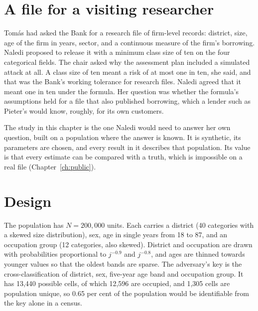 \section{A file for a visiting researcher}

Tomás had asked the Bank for a research file of firm-level records: district,
size, age of the firm in years, sector, and a continuous measure of the firm's
borrowing. Naledi proposed to release it with a minimum class size of ten on the
four categorical fields. The chair asked why the assessment plan included a
simulated attack at all. A class size of ten meant a risk of at most one in ten,
she said, and that was the Bank's working tolerance for research files. Naledi
agreed that it meant one in ten under the formula. Her question was whether the
formula's assumptions held for a file that also published borrowing, which a
lender such as Pieter's would know, roughly, for its own customers.

The study in this chapter is the one Naledi would need to answer her own question,
built on a population where the answer is known. It is synthetic, its parameters
are chosen, and every result in it describes that population. Its value is that
every estimate can be compared with a truth, which is impossible on a real file
(Chapter~\ref{ch:public}).

\section{Design}

The population has $N = 200{,}000$ units. Each carries a district (40 categories
with a skewed size distribution), sex, age in single years from 18 to 87, and an
occupation group (12 categories, also skewed). District and occupation are drawn
with probabilities proportional to $j^{-0.9}$ and $j^{-0.8}$, and ages are thinned
towards younger values so that the oldest bands are sparse.
The adversary's key is the cross-classification of district, sex, five-year age
band and occupation group. It has 13,440 possible cells, of which 12,596 are
occupied, and 1,305 cells are population unique, so 0.65 per cent of the
population would be identifiable from the key alone in a census.

